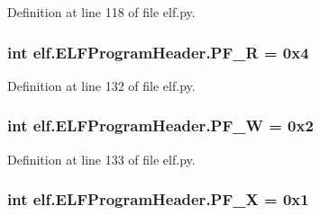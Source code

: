 Definition at line 118 of file elf.\+py.

\subsubsection[{\texorpdfstring{P\+F\+\_\+R}{PF_R}}]{\setlength{\rightskip}{0pt plus 5cm}int elf.\+E\+L\+F\+Program\+Header.\+P\+F\+\_\+R = 0x4\hspace{0.3cm}{\ttfamily [static]}}\hypertarget{clasself_1_1_e_l_f_program_header_a1cd8016f16ba799086d2a4ed814b4a50}{}\label{clasself_1_1_e_l_f_program_header_a1cd8016f16ba799086d2a4ed814b4a50}


Definition at line 132 of file elf.\+py.

\subsubsection[{\texorpdfstring{P\+F\+\_\+W}{PF_W}}]{\setlength{\rightskip}{0pt plus 5cm}int elf.\+E\+L\+F\+Program\+Header.\+P\+F\+\_\+W = 0x2\hspace{0.3cm}{\ttfamily [static]}}\hypertarget{clasself_1_1_e_l_f_program_header_ab14b4ed7174421e3b042ae8039b0adbd}{}\label{clasself_1_1_e_l_f_program_header_ab14b4ed7174421e3b042ae8039b0adbd}


Definition at line 133 of file elf.\+py.

\subsubsection[{\texorpdfstring{P\+F\+\_\+X}{PF_X}}]{\setlength{\rightskip}{0pt plus 5cm}int elf.\+E\+L\+F\+Program\+Header.\+P\+F\+\_\+X = 0x1\hspace{0.3cm}{\ttfamily [static]}}\hypertarget{clasself_1_1_e_l_f_program_header_afef877425f1c30b84e0753e869f9daa4}{}\label{clasself_1_1_e_l_f_program_header_afef877425f1c30b84e0753e869f9daa4}


